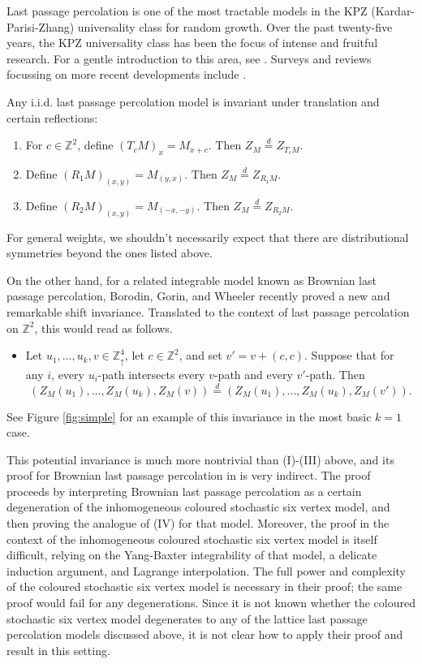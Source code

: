 \documentclass[aop, preprint]{imsart}
\theoremstyle{plain}
\theoremstyle{definition}
\theoremstyle{plain}
\newcommand{\Zd}{\mathds{Z}^4_\uparrow}
\newcommand{\Z}{\mathds{Z}}
\newcommand{\eqd}{\stackrel{d}{=}}
\begin{document}
Last passage percolation is one of the most tractable models in the KPZ (Kardar-Parisi-Zhang) universality class for random growth. Over the past twenty-five years, the KPZ universality class has been the focus of intense and fruitful research. For a gentle introduction to this area, see \citep{romik2015surprising}. Surveys and reviews focussing on more recent developments include \citep{corwin2012kardar,  quastel2011introduction, borodin2014integrable, borodin2016lectures, zygouras2018some}.

Any i.i.d. last passage percolation model is invariant under translation and certain reflections:
\begin{enumerate}[nosep, label=(\Roman*)]
	\item For $c \in \Z^2$, define $(T_cM)_x = M_{x + c}$. Then $Z_M \eqd Z_{T_c M}$.
	\item Define $(R_1 M)_{(x, y)} = M_{(y, x)}$. Then $Z_M \eqd Z_{R_1 M}$.
	\item Define $(R_2 M)_{(x, y)} = M_{(-x, -y)}$. Then $Z_M \eqd Z_{R_2 M}$.
\end{enumerate}
For general weights, we shouldn't necessarily expect that there are distributional symmetries beyond the ones listed above.

On the other hand, for a related integrable model known as Brownian last passage percolation, Borodin, Gorin, and Wheeler \citep{borodin2019shift} recently proved a new and remarkable shift invariance. Translated to the context of last passage percolation on $\Z^2$, this would read as follows.
\begin{itemize}
	\label{I:iv}
	\item [(IV)] Let $u_1, \dots, u_k, v \in \Zd$, let $c \in \Z^2$, and set $v' = v + (c, c)$. Suppose that for any $i$, every $u_i$-path intersects every $v$-path and every $v'$-path. Then
	$$
	(Z_M(u_1), \dots, Z_M(u_k), Z_M(v)) \eqd (Z_M(u_1), \dots, Z_M(u_k), Z_M(v')).
	$$
\end{itemize}
See Figure \ref{fig:simple} for an example of this invariance in the most basic $k=1$ case.



This potential invariance is much more nontrivial than (I)-(III) above, and its proof for Brownian last passage percolation in \citep{borodin2019shift} is very indirect. The proof proceeds by interpreting Brownian last passage percolation as a certain degeneration of the inhomogeneous coloured stochastic six vertex model, and then proving the analogue of (IV) for that model. Moreover, the proof in the context of the inhomogeneous coloured stochastic six vertex model is itself difficult, relying on the Yang-Baxter integrability of that model, a delicate induction argument, and Lagrange interpolation. The full power and complexity of the coloured stochastic six vertex model is necessary in their proof; the same proof would fail for any degenerations. Since it is not known whether the coloured stochastic six vertex model degenerates to any of the lattice last passage percolation models discussed above, it is not clear how to apply their proof and result in this setting.
\end{document}

